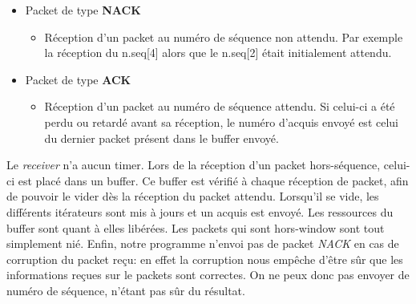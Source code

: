 \documentclass[11pt,a4paper]{article}
\begin{document}
\vspace{3mm}

\begin{itemize}
\item{Packet de type \textbf{NACK} \\
\begin{itemize}
\item{Réception d'un packet au numéro de séquence non attendu. Par exemple la réception du n.seq[4] alors que le n.seq[2] était initialement attendu.}
\end{itemize}}
\item{Packet de type \textbf{ACK} \\
\begin{itemize}
\item{Réception d'un packet au numéro de séquence attendu. Si celui-ci a été perdu ou retardé avant sa réception, le numéro d'acquis envoyé est celui du dernier packet présent dans le buffer envoyé.}
\end{itemize}
}
\end{itemize}

\vspace{3mm}
Le \textit{receiver} n'a aucun timer. Lors de la réception d'un packet hors-séquence, celui-ci est placé dans un buffer. Ce buffer est vérifié à chaque réception de packet, afin de pouvoir le vider dès la réception du packet attendu. Lorsqu'il se vide, les différents itérateurs sont mis à jours et un acquis est envoyé. Les ressources du buffer sont quant à elles libérées. Les packets qui sont hors-window sont tout simplement nié. Enfin, notre programme n'envoi pas de packet \textit{NACK} en cas de corruption du packet reçu: en effet la corruption nous empêche d'être sûr que les informations reçues sur le packets sont correctes. On ne peux donc pas envoyer de numéro de séquence, n'étant pas sûr du résultat.
\end{document}

